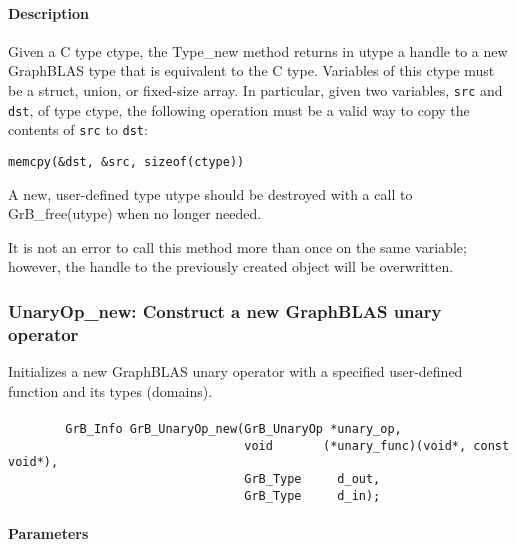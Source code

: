 \paragraph{Description}

Given a C type {\sf ctype}, the {\sf Type\_new} method returns in {\sf utype} a handle to
a new GraphBLAS type that is equivalent to the C type.  Variables of this {\sf ctype} 
must be a struct, union, or fixed-size array. In particular, given two variables, 
{\tt src} and {\tt dst}, of type {\sf ctype}, the following operation must be a 
valid way to copy the contents of {\tt src} to {\tt dst}:

\begin{center}
{\tt memcpy(\&dst, \&src, sizeof({\sf ctype}))}
\end{center}

A new, user-defined type {\sf utype} should be destroyed with a call to 
{\sf GrB\_free(utype)} when no longer needed.

It is not an error to call this method more than once on the same variable;  
however, the handle to the previously created object will be overwritten. 

\subsubsection{{\sf UnaryOp\_new}: Construct a new GraphBLAS unary operator}

Initializes a new GraphBLAS unary operator with a specified user-defined 
function and its types (domains).

\paragraph{\syntax}

\begin{verbatim}
        GrB_Info GrB_UnaryOp_new(GrB_UnaryOp *unary_op,
                                 void       (*unary_func)(void*, const void*),
                                 GrB_Type     d_out,
                                 GrB_Type     d_in);
\end{verbatim}

\paragraph{Parameters}


